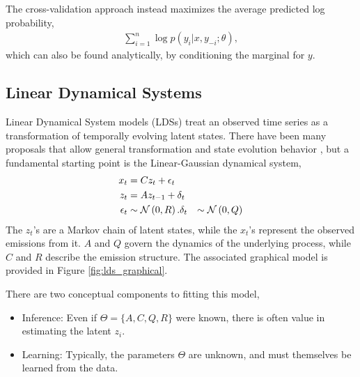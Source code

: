 \documentclass[14pt]{extreport}
\begin{document}
The cross-validation approach instead maximizes the average predicted log probability,
\begin{align*}
\sum_{i = 1}^{n} \log p\left(y_{i} \vert x, y_{-i}; \theta\right),
\end{align*}
which can also be found analytically, by conditioning the marginal for $y$.


\subsection{Linear Dynamical Systems}
\label{subsec:linear_dynamical_systems}

Linear Dynamical System models (LDSs) treat an observed time series as a
transformation of temporally evolving latent states.
There have been many proposals that allow general transformation and state
evolution behavior \citep{hostetler1983nonlinear, wan2000unscented}, but a
fundamental starting point is the Linear-Gaussian dynamical system,
\begin{align*}
  x_{t} &= C z_{t} + \epsilon_{t} \\
  z_{t} &= A z_{t - 1} + \delta_{t} \\
  \epsilon_{t} &\sim \mathcal{N}\left(0, R\right).
  \delta_{t} &\sim \mathcal{N}\left(0, Q\right) \\
\end{align*}
The $z_{t}$'s are a Markov chain of latent states, while the $x_{t}$'s represent
the observed emissions from it. $A$ and $Q$ govern the dynamics of the
underlying process, while $C$ and $R$ describe the emission structure. The
associated graphical model is provided in Figure \ref{fig:lds_graphical}.

There are two conceptual components to fitting this model,
\begin{itemize}
\item Inference: Even if $\Theta = \{A, C, Q, R\}$ were known, there
  is often value in estimating the latent $z_{i}$.
\item Learning: Typically, the parameters $\Theta$ are unknown, and must
  themselves be learned from the data.
\end{itemize}
\end{document}

